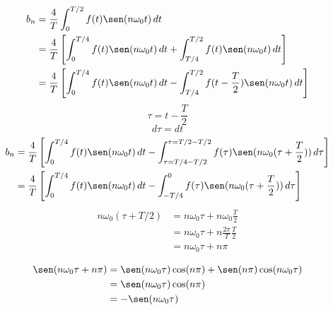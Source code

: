 \begin{equation*}
\begin{split}
    b_n
        &=\frac{4}{T}\int_0^{T/2} f(t)\sen(n\omega_0 t)\,dt\\
        &=\frac{4}{T}\left[
            \int_0^{T/4} f(t)\sen(n\omega_0 t)\,dt+
            \int_{T/4}^{T/2} f(t)\sen(n\omega_0 t)\,dt
        \right]\\
        &=\frac{4}{T}\left[
            \int_0^{T/4} f(t)\sen(n\omega_0 t)\,dt-
            \int_{T/4}^{T/2} f(t-\frac{T}{2})\sen(n\omega_0 t)\,dt
        \right]\\
\end{split}
\end{equation*}
\begin{equation*}
    \tau=t-\frac{T}{2}
\end{equation*}
\begin{equation*}
    d\tau=dt
\end{equation*}
\begin{equation*}
\begin{split}
    b_n
        &=\frac{4}{T}\left[
            \int_0^{T/4} f(t)\sen(n\omega_0 t)\,dt-
            \int_{\tau=T/4-T/2}^{\tau=T/2-T/2}
                f(\tau)\sen(n\omega_0(\tau+\frac{T}{2}))\,d\tau
        \right]\\
        &=\frac{4}{T}\left[
            \int_0^{T/4} f(t)\sen(n\omega_0 t)\,dt-
            \int_{-T/4}^{0}
                f(\tau)\sen(n\omega_0(\tau+\frac{T}{2}))\,d\tau
        \right]\\
\end{split}
\end{equation*}
\begin{equation*}
\begin{split}
    n\omega_0(\tau+T/2)
        &=n\omega_0\tau+n\omega_0\frac{T}{2}\\
        &=n\omega_0\tau+n\frac{2\pi}{T}\frac{T}{2}\\
        &=n\omega_0\tau+n\pi\\
\end{split}
\end{equation*}
\begin{equation*}
\begin{split}
    \sen(n\omega_0\tau+n\pi)
        &=\sen(n\omega_0\tau)\cos(n\pi)+\sen(n\pi)\cos(n\omega_0\tau)\\
        &=\sen(n\omega_0\tau)\cos(n\pi)\\
        &=-\sen(n\omega_0\tau)\\
\end{split}
\end{equation*}
